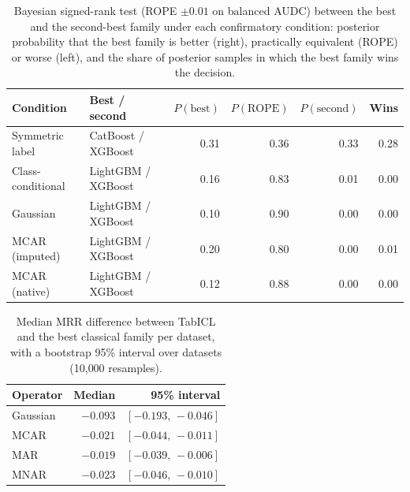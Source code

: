 \begin{table}[t]
\centering
\footnotesize
\caption{Bayesian signed-rank test (ROPE $\pm0.01$ on balanced AUDC) between the best and the second-best family under each confirmatory condition: posterior probability that the best family is better (right), practically equivalent (ROPE) or worse (left), and the share of posterior samples in which the best family wins the decision.}
\label{tab:sens_bayes}
\begin{tabular}{@{}llrrrr@{}}
\toprule
Condition & Best / second & $P(\mathrm{best})$ & $P(\mathrm{ROPE})$ & $P(\mathrm{second})$ & Wins \\
\midrule
Symmetric label & CatBoost / XGBoost & 0.31 & 0.36 & 0.33 & 0.28 \\
Class-conditional & LightGBM / XGBoost & 0.16 & 0.83 & 0.01 & 0.00 \\
Gaussian & LightGBM / XGBoost & 0.10 & 0.90 & 0.00 & 0.00 \\
MCAR (imputed) & LightGBM / XGBoost & 0.20 & 0.80 & 0.00 & 0.01 \\
MCAR (native) & LightGBM / XGBoost & 0.12 & 0.88 & 0.00 & 0.00 \\
\bottomrule
\end{tabular}
\end{table}

\begin{table}[t]
\centering
\footnotesize
\caption{Median MRR difference between TabICL and the best classical family per dataset{,} with a bootstrap 95\% interval over datasets (10{,}000 resamples).}
\label{tab:sens_gap}
\begin{tabular}{@{}lrr@{}}
\toprule
Operator & Median & 95\% interval \\
\midrule
Gaussian & $-0.093$ & $[-0.193,\,-0.046]$ \\
MCAR & $-0.021$ & $[-0.044,\,-0.011]$ \\
MAR & $-0.019$ & $[-0.039,\,-0.006]$ \\
MNAR & $-0.023$ & $[-0.046,\,-0.010]$ \\
\bottomrule
\end{tabular}
\end{table}
